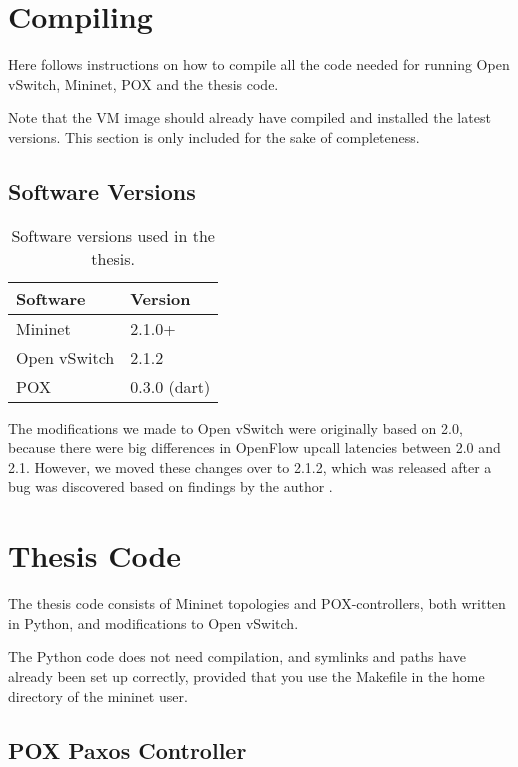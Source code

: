 \section{Compiling}
\label{chapter:compiling}

Here follows instructions on how to compile all the code needed for running
Open vSwitch, Mininet, POX and the thesis code.

Note that the VM image should already have compiled and installed the latest
versions.  This section is only included for the sake of completeness.

\subsection{Software Versions}
\label{chapter:software.versions}

\begin{table}[H]
  \centering
  \begin{tabular}{ll}
  \hline
    \textbf{Software} & \textbf{Version} \\
  \hline
    Mininet & 2.1.0+ \\
    Open vSwitch & 2.1.2 \\
    POX & 0.3.0 (dart) \\
  \hline
  \end{tabular}
  \caption{Software versions used in the thesis.}
  \label{table:software.versions}
\end{table}

The modifications we made to Open vSwitch were
originally based on 2.0, because there were big differences in OpenFlow
upcall latencies between 2.0 and 2.1.  However, we moved these changes over
to 2.1.2, which was released after a bug was discovered based on findings by
the author \cite{ovs.bug}.

\section{Thesis Code}

The thesis code consists of Mininet topologies and POX-controllers, both
written in Python, and modifications to Open vSwitch.

The Python code does not need compilation, and symlinks and paths have
already been set up correctly, provided that you use the Makefile in the
home directory of the mininet user.

\subsection{POX Paxos Controller}
\label{chapter:pox.paxos.controller}

